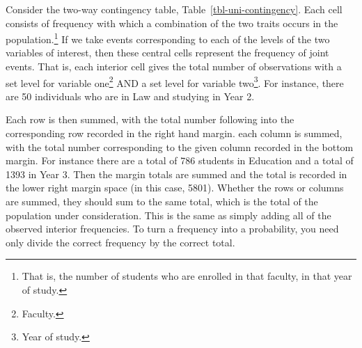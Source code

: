 \documentclass[
  letterpaper,
  DIV=11,
  numbers=noendperiod]{scrreprt}
\theoremstyle{definition}
\theoremstyle{definition}
\theoremstyle{definition}
\theoremstyle{remark}
\begin{document}
Consider the two-way contingency table, Table~\ref{tbl-uni-contingency}.
Each cell consists of frequency with which a combination of the two
traits occurs in the population.\footnote{That is, the number of
  students who are enrolled in that faculty, in that year of study.} If
we take events corresponding to each of the levels of the two variables
of interest, then these central cells represent the frequency of joint
events. That is, each interior cell gives the total number of
observations with a set level for variable one\footnote{Faculty.} AND a
set level for variable two\footnote{Year of study.}. For instance, there
are 50 individuals who are in Law and studying in Year 2.

Each row is then summed, with the total number following into the
corresponding row recorded in the right hand margin. each column is
summed, with the total number corresponding to the given column recorded
in the bottom margin. For instance there are a total of 786 students in
Education and a total of 1393 in Year 3. Then the margin totals are
summed and the total is recorded in the lower right margin space (in
this case, 5801). Whether the rows or columns are summed, they should
sum to the same total, which is the total of the population under
consideration. This is the same as simply adding all of the observed
interior frequencies. To turn a frequency into a probability, you need
only divide the correct frequency by the correct total.
\end{document}
